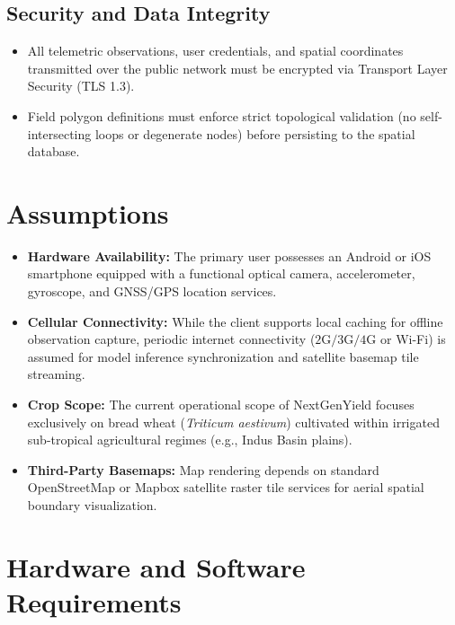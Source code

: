 \subsection{Security and Data Integrity}
\begin{itemize}
    \item All telemetric observations, user credentials, and spatial coordinates transmitted over the public network must be encrypted via Transport Layer Security (TLS 1.3).
    \item Field polygon definitions must enforce strict topological validation (no self-intersecting loops or degenerate nodes) before persisting to the spatial database.
\end{itemize}

\section{Assumptions}
\begin{itemize}
    \item \textbf{Hardware Availability:} The primary user possesses an Android or iOS smartphone equipped with a functional optical camera, accelerometer, gyroscope, and GNSS/GPS location services.
    \item \textbf{Cellular Connectivity:} While the client supports local caching for offline observation capture, periodic internet connectivity ($2\text{G}/3\text{G}/4\text{G}$ or Wi-Fi) is assumed for model inference synchronization and satellite basemap tile streaming.
    \item \textbf{Crop Scope:} The current operational scope of NextGenYield focuses exclusively on bread wheat (\textit{Triticum aestivum}) cultivated within irrigated sub-tropical agricultural regimes (e.g., Indus Basin plains).
    \item \textbf{Third-Party Basemaps:} Map rendering depends on standard OpenStreetMap or Mapbox satellite raster tile services for aerial spatial boundary visualization.
\end{itemize}

\section{Hardware and Software Requirements}


